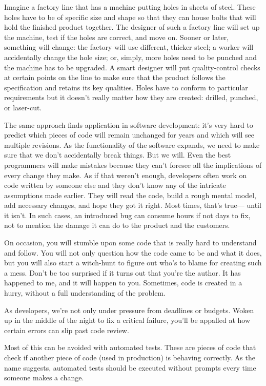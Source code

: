 Imagine a factory line that has a machine putting holes in sheets of steel. These holes have to be of specific size and shape so that they can house bolts that will hold the finished product together. The designer of such a factory line will set up the machine, test if the holes are correct, and move on. Sooner or later, something will change: the factory will use different, thicker steel; a worker will accidentally change the hole size; or, simply, more holes need to be punched and the machine has to be upgraded. A smart designer will put quality-control checks at certain points on the line to make sure that the product follows the specification and retains its key qualities. Holes have to conform to particular requirements but it doesn't really matter how they are created: drilled, punched, or laser-cut.

The same approach finds application in software development: it's very hard to predict which pieces of code will remain unchanged for years and which will see multiple revisions. As the functionality of the software expands, we need to make sure that we don't accidentally break things. But we will. Even the best programmers will make mistakes because they can't foresee all the implications of every change they make. As if that weren't enough, developers often work on code written by someone else and they don't know any of the intricate assumptions made earlier. They will read the code, build a rough mental model, add necessary changes, and hope they got it right. Most times, that's true— until it isn't. In such cases, an introduced bug can consume hours if not days to fix, not to mention the damage it can do to the product and the customers.

On occasion, you will stumble upon some code that is really hard to understand and follow. You will not only question how the code came to be and what it does, but you will also start a witch-hunt to figure out who's to blame for creating such a mess. Don't be too surprised if it turns out that you're the author. It has happened to me, and it will happen to you. Sometimes, code is created in a hurry, without a full understanding of the problem.

As developers, we're not only under pressure from deadlines or budgets. Woken up in the middle of the night to fix a critical failure, you'll be appalled at how certain errors can slip past code review.

Most of this can be avoided with automated tests. These are pieces of code that check if another piece of code (used in production) is behaving correctly. As the name suggests, automated tests should be executed without prompts every time someone makes a change.

